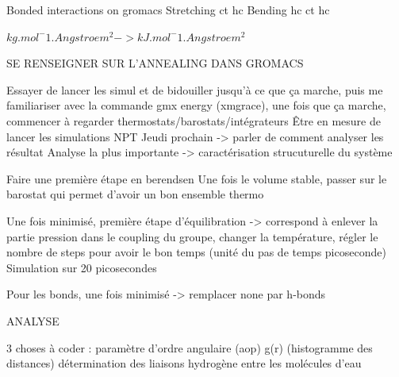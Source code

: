 Bonded interactions on gromacs
Stretching ct hc
Bending hc ct hc

$kg.mol^-1.Angstroem^2 -> kJ.mol^-1.Angstroem^2$

SE RENSEIGNER SUR L'ANNEALING DANS GROMACS

Essayer de lancer les simul et de bidouiller jusqu'à ce que ça marche, puis me familiariser avec la commande gmx energy (xmgrace), une fois que ça marche, commencer à regarder thermostats/barostats/intégrateurs
Être en mesure de lancer les simulations NPT
Jeudi prochain -> parler de comment analyser les résultat
Analyse la plus importante -> caractérisation strucuturelle du système

Faire une première étape en berendsen
Une fois le volume stable, passer sur le barostat qui permet d'avoir un bon ensemble thermo

Une fois minimisé, première étape d'équilibration -> correspond à enlever la partie pression dans le coupling du groupe, changer la température, régler le nombre de steps pour avoir le bon temps (unité du pas de temps picoseconde)
Simulation sur 20 picosecondes

Pour les bonds, une fois minimisé -> remplacer none par h-bonds

ANALYSE

3 choses à coder :
paramètre d'ordre angulaire (aop)
g(r) (histogramme des distances)
détermination des liaisons hydrogène entre les molécules d'eau